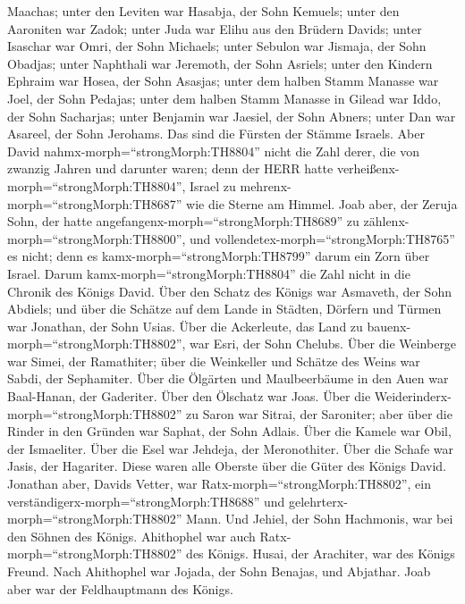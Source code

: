Maachas;  unter den Leviten war Hasabja, der Sohn Kemuels;
unter den Aaroniten war Zadok;  unter Juda war Elihu aus
den Brüdern Davids; unter Isaschar war Omri, der Sohn Michaels;
 unter Sebulon war Jismaja, der Sohn Obadjas; unter
Naphthali war Jeremoth, der Sohn Asriels;  unter den
Kindern Ephraim war Hosea, der Sohn Asasjas; unter dem halben Stamm
Manasse war Joel, der Sohn Pedajas;  unter dem halben Stamm
Manasse in Gilead war Iddo, der Sohn Sacharjas; unter Benjamin war
Jaesiel, der Sohn Abners;  unter Dan war Asareel, der Sohn
Jerohams. Das sind die Fürsten der Stämme Israels.  Aber
David nahmx-morph=``strongMorph:TH8804'' nicht die Zahl derer, die von
zwanzig Jahren und darunter waren; denn der HERR hatte
verheißenx-morph=``strongMorph:TH8804'', Israel zu
mehrenx-morph=``strongMorph:TH8687'' wie die Sterne am Himmel.
 Joab aber, der Zeruja Sohn, der hatte
angefangenx-morph=``strongMorph:TH8689'' zu
zählenx-morph=``strongMorph:TH8800'', und
vollendetex-morph=``strongMorph:TH8765'' es nicht; denn es
kamx-morph=``strongMorph:TH8799'' darum ein Zorn über Israel. Darum
kamx-morph=``strongMorph:TH8804'' die Zahl nicht in die Chronik des
Königs David.  Über den Schatz des Königs war Asmaveth, der
Sohn Abdiels; und über die Schätze auf dem Lande in Städten, Dörfern und
Türmen war Jonathan, der Sohn Usias.  Über die Ackerleute,
das Land zu bauenx-morph=``strongMorph:TH8802'', war Esri, der Sohn
Chelubs.  Über die Weinberge war Simei, der Ramathiter;
über die Weinkeller und Schätze des Weins war Sabdi, der Sephamiter.
 Über die Ölgärten und Maulbeerbäume in den Auen war
Baal-Hanan, der Gaderiter. Über den Ölschatz war Joas. 
Über die Weiderinderx-morph=``strongMorph:TH8802'' zu Saron war Sitrai,
der Saroniter; aber über die Rinder in den Gründen war Saphat, der Sohn
Adlais.  Über die Kamele war Obil, der Ismaeliter. Über die
Esel war Jehdeja, der Meronothiter.  Über die Schafe war
Jasis, der Hagariter. Diese waren alle Oberste über die Güter des Königs
David.  Jonathan aber, Davids Vetter, war
Ratx-morph=``strongMorph:TH8802'', ein
verständigerx-morph=``strongMorph:TH8688'' und
gelehrterx-morph=``strongMorph:TH8802'' Mann. Und Jehiel, der Sohn
Hachmonis, war bei den Söhnen des Königs.  Ahithophel war
auch Ratx-morph=``strongMorph:TH8802'' des Königs. Husai, der Arachiter,
war des Königs Freund.  Nach Ahithophel war Jojada, der
Sohn Benajas, und Abjathar. Joab aber war der Feldhauptmann des Königs.

